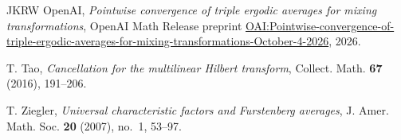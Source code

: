 \begin{thebibliography}{JKRW}
OpenAI, \emph{Pointwise convergence of triple ergodic averages for
mixing transformations}, OpenAI Math Release preprint
\href{https://github.com/openai/math/blob/main/preprints/Pointwise-convergence-of-triple-ergodic-averages-for-mixing-transformations-October-4-2026/pointwise-triple-ergodic-averages-mixing-transformations.pdf}{OAI:Pointwise-convergence-of-triple-ergodic-averages-for-mixing-transformations-October-4-2026},
2026.

T. Tao, \emph{Cancellation for the multilinear Hilbert transform},
Collect. Math. \textbf{67} (2016), 191--206.

T. Ziegler, \emph{Universal characteristic factors and Furstenberg
averages}, J. Amer. Math. Soc. \textbf{20} (2007), no.~1, 53--97.
\end{thebibliography}

